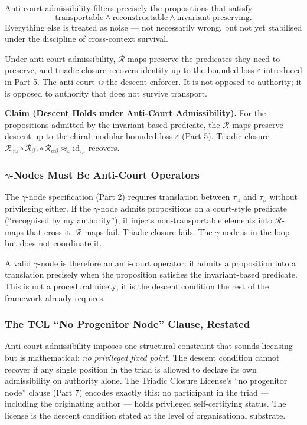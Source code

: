 \documentclass[
]{article}
\begin{document}
Anti-court admissibility filters precisely the propositions that
satisfy
\[
  \text{transportable} \land \text{reconstructable} \land
  \text{invariant-preserving}.
\]
Everything else is treated as noise --- not necessarily wrong, but
not yet stabilised under the discipline of cross-context survival.

Under anti-court admissibility, \(\mathcal{R}\)-maps preserve the predicates
they need to preserve, and triadic closure recovers identity up to
the bounded loss \(\varepsilon\) introduced in Part 5. The
anti-court \emph{is} the descent enforcer. It is not opposed to
authority; it is opposed to authority that does not survive
transport.

\textbf{Claim (Descent Holds under Anti-Court Admissibility).}
For the propositions admitted by the invariant-based predicate,
the \(\mathcal{R}\)-maps preserve descent up to the chiral-modular bounded loss
\(\varepsilon\) (Part 5). Triadic closure
\(\mathcal{R}_{\gamma\alpha} \circ \mathcal{R}_{\beta\gamma} \circ
\mathcal{R}_{\alpha\beta} \approx_{\varepsilon}
\mathrm{id}_{\tau_\alpha}\) recovers.

\subsubsection{\(\gamma\)-Nodes Must Be Anti-Court
Operators}\label{gamma-nodes-must-be-anti-court}

The \(\gamma\)-node specification (Part 2) requires translation between
\(\tau_\alpha\) and \(\tau_\beta\) without privileging either. If
the \(\gamma\)-node admits propositions on a court-style predicate
(``recognised by my authority''), it injects non-transportable
elements into \(\mathcal{R}\)-maps that cross it. \(\mathcal{R}\)-maps fail. Triadic closure
fails. The \(\gamma\)-node is in the loop but does not coordinate it.

A valid \(\gamma\)-node is therefore an anti-court operator: it admits a
proposition into a translation precisely when the proposition
satisfies the invariant-based predicate. This is not a procedural
nicety; it is the descent condition the rest of the framework
already requires.

\subsubsection{The TCL ``No Progenitor Node'' Clause,
Restated}\label{tcl-no-progenitor-restated}

Anti-court admissibility imposes one structural constraint that
sounds licensing but is mathematical: \emph{no privileged fixed
point}. The descent condition cannot recover if any single
position in the triad is allowed to declare its own admissibility
on authority alone. The Triadic Closure License's ``no progenitor
node'' clause (Part 7) encodes exactly this: no participant in the
triad --- including the originating author --- holds privileged
self-certifying status. The license is the descent condition
stated at the level of organisational substrate.
\end{document}
